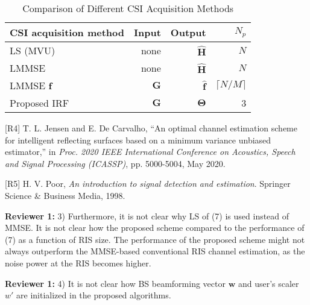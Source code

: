 \documentclass[a4paper,12pt]{article}
\begin{document}
{{\begin{table}[h]
    \caption{Comparison of Different CSI Acquisition Methods}
    \label{tab:comp CE}
    \centering
    \begin{tabular}{|l|r|r|r|}
        \hline 
        CSI acquisition method & Input & Output & $N_p$ \\ 
        \hline
        LS (MVU)        & none    & $\hat{\bm H}$ & $N$  \\
        \hline
        LMMSE  & none & $\hat{\bm H}$ & $N$  \\
        \hline
        LMMSE $\bm f$ &  ${\bm G}$        & $\hat{\bm f}$ & $\lceil N/M\rceil$ \\
        \hline 
        Proposed IRF & $\bm G$ & $\bm \Theta$ & 3  \\
        \hline 
    \end{tabular}
\end{table}


[R4] T. L. Jensen and E. De Carvalho, ``An optimal channel estimation scheme for intelligent reflecting surfaces based on a minimum variance unbiased estimator,'' in {\it Proc. 2020 IEEE International Conference on Acoustics, Speech and Signal Processing (ICASSP)}, pp. 5000-5004, May 2020. 

[R5] H. V. Poor, {\it An introduction to signal detection and estimation}. Springer Science \& Business Media, 1998. 
}}

\textbf{Reviewer 1:}
3) Furthermore, it is not clear why LS of (7) is used instead of MMSE. It is not clear how the proposed scheme compared to the performance of (7) as a function of RIS size. The performance of the proposed scheme might not always outperform the MMSE-based conventional RIS channel estimation, as the noise power at the RIS becomes higher. 

{}


\textbf{Reviewer 1:}
4) It is not clear how BS beamforming vector $\bm w$ and user's scaler $w'$ are initialized in the proposed algorithms.
\end{document}
